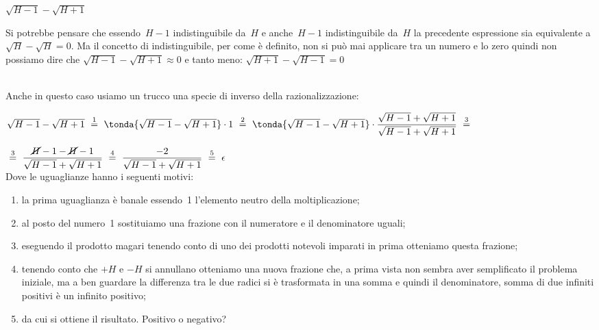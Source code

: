 \begin{esempio}
\(\sqrt{H -1} - \sqrt{H +1}\)

\begin{osservazione}
 Si potrebbe pensare che essendo~\(H -1\) indistinguibile da~\(H\) e 
anche~\(H -1\) indistinguibile da~\(H\) la precedente espressione sia 
equivalente a \(\sqrt{H} - \sqrt{H} = 0\).
Ma il concetto di indistinguibile, per come è definito, 
non si può mai applicare tra un numero e lo zero quindi non possiamo dire che 
\(\sqrt{H -1} - \sqrt{H +1} \approx 0\) e 
tanto meno: \(\sqrt{H +1} - \sqrt{H -1} = 0\)
\end{osservazione}\\

Anche in questo caso usiamo un trucco una specie di inverso della 
razionalizzazione:

\(\sqrt{H -1} - \sqrt{H +1}
~ \stackrel{1}{=} ~
   \tonda{\sqrt{H -1} - \sqrt{H +1}} \cdot 1 
~ \stackrel{2}{=} ~
   \tonda{\sqrt{H -1} - \sqrt{H +1}} \cdot 
   \dfrac{\sqrt{H -1} + \sqrt{H +1}}{\sqrt{H -1} + \sqrt{H +1}}
~ \stackrel{3}{=} ~\)

\(~ \stackrel{3}{=} ~
   \dfrac{\cancel{H} -1 - \cancel{H} -1}{\sqrt{H -1} + \sqrt{H +1}}
~ \stackrel{4}{=} ~
   \dfrac{-2}{\sqrt{H -1} + \sqrt{H +1}}
~ \stackrel{5}{=} ~
  \epsilon\)\\

Dove le uguaglianze hanno i seguenti motivi:
\begin{enumerate} [nosep]
 \item la prima uguaglianza è banale essendo~1 l'elemento 
neutro della moltiplicazione; 
 \item al posto del numero~1 sostituiamo una frazione con 
il numeratore e il denominatore uguali; 
 \item eseguendo il prodotto magari tenendo conto di uno 
dei prodotti notevoli imparati in prima otteniamo questa 
frazione;
 \item tenendo conto che \(+H\) e \(-H\) si annullano 
otteniamo una nuova frazione che, a prima vista non sembra 
aver semplificato il problema 
iniziale, ma a ben guardare la differenza tra le due radici 
si è trasformata in una somma 
e quindi il denominatore, somma di due infiniti positivi è 
un infinito positivo;
 \item da cui si ottiene il risultato. Positivo o negativo?
\end{enumerate}
\end{esempio}



